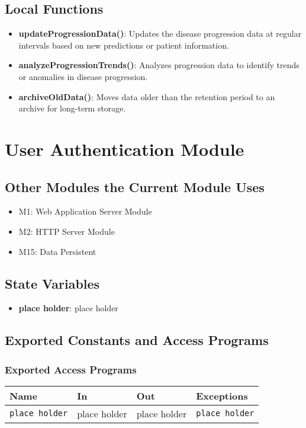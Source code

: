 \documentclass[12pt, titlepage]{article}
\begin{document}
\subsection{Local Functions}
\begin{itemize}
\item \textbf{updateProgressionData()}: Updates the disease progression data at regular intervals based on new predictions or patient information.
\item \textbf{analyzeProgressionTrends()}: Analyzes progression data to identify trends or anomalies in disease progression.
\item \textbf{archiveOldData()}: Moves data older than the retention period to an archive for long-term storage.
\end{itemize}

\section{User Authentication Module}

\subsection{Other Modules the Current Module Uses}
\begin{itemize}
    \item M1: Web Application Server Module
    \item M2: HTTP Server Module
    \item M15: Data Persistent
\end{itemize}

\subsection{State Variables}
\begin{itemize}
    \item \textbf{place holder}: place holder
\end{itemize}

\subsection{Exported Constants and Access Programs}
\subsubsection{Exported Access Programs}
\begin{tabular}{|l|l|l|l|}
    \hline
    \textbf{Name} & \textbf{In} & \textbf{Out} & \textbf{Exceptions} \\
    \hline 
    \texttt{place holder} & place holder & place holder & \texttt{place holder}
    \\
    \hline
\end{tabular}
\end{document}
